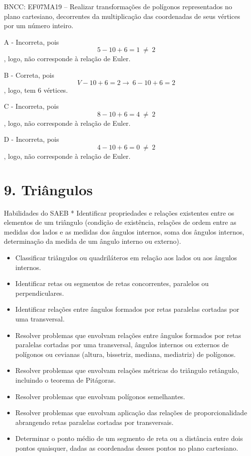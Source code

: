BNCC: EF07MA19 -- Realizar transformações de polígonos representados no
plano cartesiano, decorrentes da multiplicação das coordenadas de seus
vértices por um número inteiro.

A - Incorreta, pois \[5 - 10 + 6 = 1\  \neq \ 2\], logo, não corresponde
à relação de Euler.

B - Correta, pois \[V - 10 + 6 = 2 \rightarrow \ 6 - 10 + 6 = 2\] ,
logo, tem 6 vértices.

C - Incorreta, pois \[8 - 10 + 6 = 4\  \neq \ 2\], logo, não corresponde
à relação de Euler.

D - Incorreta, pois \[4 - 10 + 6 = 0\  \neq \ 2\], logo, não corresponde
à relação de Euler.

\hypertarget{triuxe2ngulos}{%
\section{9. Triângulos}\label{triuxe2ngulos}}

Habilidades do SAEB * Identificar propriedades e relações existentes
entre os elementos de um triângulo (condição de existência, relações de
ordem entre as medidas dos lados e as medidas dos ângulos internos, soma
dos ângulos internos, determinação da medida de um ângulo interno ou
externo).

\begin{itemize}
\item
  Classificar triângulos ou quadriláteros em relação aos lados ou aos
  ângulos internos.
\item
  Identificar retas ou segmentos de retas concorrentes, paralelos ou
  perpendiculares.
\item
  Identificar relações entre ângulos formados por retas paralelas
  cortadas por uma transversal.
\item
  Resolver problemas que envolvam relações entre ângulos formados por
  retas paralelas cortadas por uma transversal, ângulos internos ou
  externos de polígonos ou cevianas (altura, bissetriz, mediana,
  mediatriz) de polígonos.
\item
  Resolver problemas que envolvam relações métricas do triângulo
  retângulo, incluindo o teorema de Pitágoras.
\item
  Resolver problemas que envolvam polígonos semelhantes.
\item
  Resolver problemas que envolvam aplicação das relações de
  proporcionalidade abrangendo retas paralelas cortadas por
  transversais.
\item
  Determinar o ponto médio de um segmento de reta ou a distância entre
  dois pontos quaisquer, dadas as coordenadas desses pontos no plano
  cartesiano.
\end{itemize}

